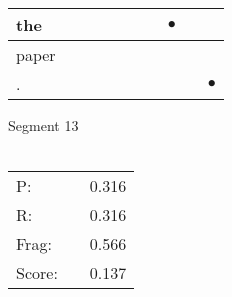 \documentclass[landscape]{article}
\newcommand{\ssp}{\hspace{2pt}}
\newcommand{\mex}{\cellcolor{g}$\bullet$}
\begin{document}
\begin{tabular}{|l|p{10pt}|p{10pt}|p{10pt}|p{10pt}|p{10pt}|p{10pt}|p{10pt}|p{10pt}|p{10pt}|}
\hline
\ssp \cellcolor{ref6}the \ssp&\hspace{2pt}&\hspace{2pt}&\hspace{2pt}&\hspace{2pt}&\hspace{2pt}&\hspace{2pt}&\hspace{2pt}\mex&\hspace{2pt}&\hspace{2pt}\\
\hline
\ssp paper \ssp&\hspace{2pt}&\hspace{2pt}&\hspace{2pt}&\hspace{2pt}&\hspace{2pt}&\hspace{2pt}&\hspace{2pt}&\hspace{2pt}&\hspace{2pt}\\
\hline
\ssp \cellcolor{ref8}. \ssp&\hspace{2pt}&\hspace{2pt}&\hspace{2pt}&\hspace{2pt}&\hspace{2pt}&\hspace{2pt}&\hspace{2pt}&\hspace{2pt}&\hspace{2pt}\mex\\
\hline
\end{tabular}

\vspace{6pt}
\noindent Segment 13\\\\
\noindent\begin{tabular}{lm{12pt}r}
\hline
P:&&0.316\\
R:&&0.316\\
Frag:&&0.566\\
Score:&&0.137\\
\end{tabular}

\newpage
\end{document}
